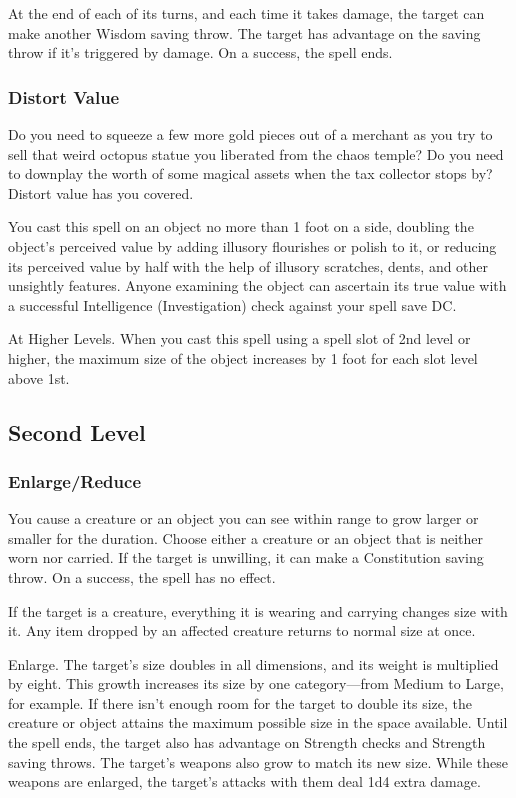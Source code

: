 \documentclass[11pt]{article}
\begin{document}
At the end of each of its turns, and each time it takes damage, the target can make another Wisdom saving throw. The target has advantage on the saving throw if it's triggered by damage. On a success, the spell ends.
\subsubsection{Distort Value}
\label{sec:org9e35d47}
Do you need to squeeze a few more gold pieces out of a merchant as you try to sell that weird octopus statue you liberated from the chaos temple? Do you need to downplay the worth of some magical assets when the tax collector stops by? Distort value has you covered.

You cast this spell on an object no more than 1 foot on a side, doubling the object's perceived value by adding illusory flourishes or polish to it, or reducing its perceived value by half with the help of illusory scratches, dents, and other unsightly features. Anyone examining the object can ascertain its true value with a successful Intelligence (Investigation) check against your spell save DC.

At Higher Levels. When you cast this spell using a spell slot of 2nd level or higher, the maximum size of the object increases by 1 foot for each slot level above 1st.
\subsection{Second Level}
\label{sec:org815e177}
\subsubsection{Enlarge/Reduce}
\label{sec:org2853ed4}
You cause a creature or an object you can see within range to grow larger or smaller for the duration. Choose either a creature or an object that is neither worn nor carried. If the target is unwilling, it can make a Constitution saving throw. On a success, the spell has no effect.

If the target is a creature, everything it is wearing and carrying changes size with it. Any item dropped by an affected creature returns to normal size at once.

Enlarge. The target's size doubles in all dimensions, and its weight is multiplied by eight. This growth increases its size by one category—from Medium to Large, for example. If there isn't enough room for the target to double its size, the creature or object attains the maximum possible size in the space available. Until the spell ends, the target also has advantage on Strength checks and Strength saving throws. The target's weapons also grow to match its new size. While these weapons are enlarged, the target's attacks with them deal 1d4 extra damage.
\end{document}
